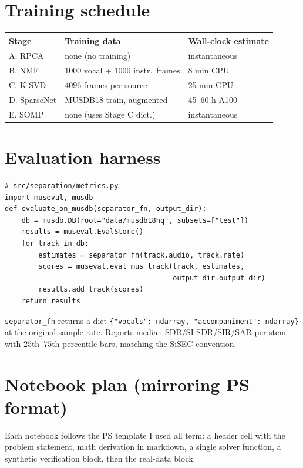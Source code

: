 \documentclass[10pt]{article}
\begin{document}
\section{Training schedule}
\begin{tabular}{@{}lll@{}}
\toprule
\textbf{Stage} & \textbf{Training data} & \textbf{Wall-clock estimate} \\
\midrule
A. RPCA           & none (no training)            & instantaneous \\
B. NMF            & $1000$ vocal + $1000$ instr.\ frames & 8 min CPU \\
C. K-SVD          & $4096$ frames per source       & 25 min CPU \\
D. SparseNet      & MUSDB18 train, augmented       & 45--60 h A100 \\
E. SOMP           & none (uses Stage C dict.)      & instantaneous \\
\bottomrule
\end{tabular}

\section{Evaluation harness}
\begin{lstlisting}
# src/separation/metrics.py
import museval, musdb
def evaluate_on_musdb(separator_fn, output_dir):
    db = musdb.DB(root="data/musdb18hq", subsets=["test"])
    results = museval.EvalStore()
    for track in db:
        estimates = separator_fn(track.audio, track.rate)
        scores = museval.eval_mus_track(track, estimates,
                                        output_dir=output_dir)
        results.add_track(scores)
    return results
\end{lstlisting}
\texttt{separator\_fn} returns a dict
\texttt{\{"vocals": ndarray, "accompaniment": ndarray\}} at the original
sample rate.  Reports median SDR/SI-SDR/SIR/SAR per stem with
$25$th--$75$th percentile bars, matching the SiSEC convention.

\section{Notebook plan (mirroring PS format)}
Each notebook follows the PS template I used all term: a header cell with
the problem statement, math derivation in markdown, a single solver
function, a synthetic verification block, then the real-data block.
\end{document}

